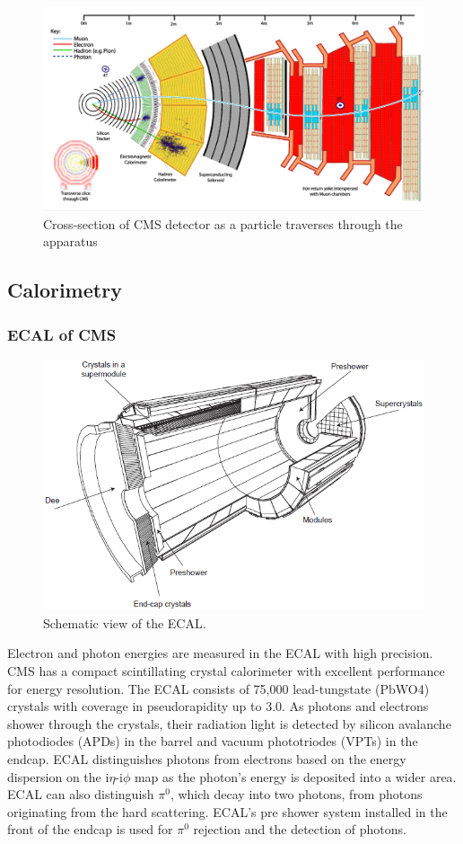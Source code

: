 \begin{figure}[h!]
  \label{fig:cmsxsec}
  \centering
  \includegraphics[width=0.87\linewidth]{figs/cmsxsec.png}
  \caption{Cross-section of CMS detector as a particle traverses through the apparatus \cite{xsec}}
\end{figure}
\subsection{Calorimetry}
\subsubsection{ECAL of CMS}
\begin{figure}[h!]
  \label{fig:ECAL}
  \centering
  \includegraphics[width=0.87\linewidth]{figs/ECAL.png}
  \caption{Schematic view of the ECAL. \cite{ecal}}
\end{figure}
Electron and photon energies are measured in the ECAL with high precision. 
CMS has a compact scintillating crystal calorimeter with excellent performance for energy resolution. 
The ECAL consists of 75,000 lead-tungstate (PbWO4) crystals with coverage in pseudorapidity up to 3.0. As photons and electrons shower through the crystals, their radiation light is detected by silicon avalanche photodiodes (APDs) in the barrel and vacuum phototriodes (VPTs) in the endcap.
ECAL distinguishes photons from electrons based on the energy dispersion on the i$\eta$-i$\phi$ map as the photon's energy is deposited into a wider area.
ECAL can also distinguish $\pi^{0}$, which decay into two photons, from photons originating from the hard scattering.
ECAL's pre shower system installed in the front of the endcap is used for $\pi^{0}$ rejection and the detection of photons.

